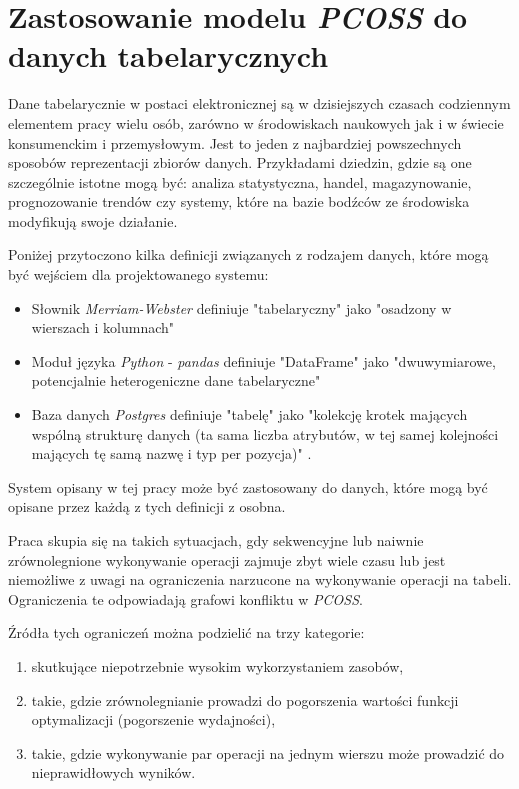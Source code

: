 \documentclass[brudnopis]{xmgr}
\begin{document}
\chapter{Zastosowanie modelu \emph{PCOSS} do danych tabelarycznych}

Dane tabelarycznie w postaci elektronicznej są w dzisiejszych czasach codziennym elementem pracy wielu osób, zarówno w środowiskach naukowych jak i w świecie konsumenckim i przemysłowym. Jest to jeden z najbardziej powszechnych sposobów reprezentacji zbiorów danych. Przykładami dziedzin, gdzie są one szczególnie istotne mogą być: analiza statystyczna, handel, magazynowanie, prognozowanie trendów czy systemy, które na bazie bodźców ze środowiska modyfikują swoje działanie.
\medskip

Poniżej przytoczono kilka definicji związanych z rodzajem danych, które mogą być wejściem dla projektowanego systemu:

\begin{itemize}
    \item Słownik \emph{Merriam-Webster} definiuje "tabelaryczny" jako "osadzony w wierszach i kolumnach" \cite{MW:TAB}
    \item Moduł języka \emph{Python} - \emph{pandas} definiuje "DataFrame" jako "dwuwymiarowe, potencjalnie heterogeniczne dane tabelaryczne" \cite{P:DF}
    \item Baza danych \emph{Postgres} definiuje "tabelę" jako "kolekcję krotek mających wspólną strukturę danych (ta sama liczba atrybutów, w tej samej kolejności mających tę samą nazwę i typ per pozycja)" \cite{PSQL:TAB}.
\end{itemize}
\medskip

System opisany w tej pracy może być zastosowany do danych, które mogą być opisane przez każdą z tych definicji z osobna.

Praca skupia się na takich sytuacjach, gdy sekwencyjne lub naiwnie zrównolegnione wykonywanie operacji zajmuje zbyt wiele czasu lub jest niemożliwe z uwagi na ograniczenia narzucone na wykonywanie operacji na tabeli.
Ograniczenia te odpowiadają grafowi konfliktu w \emph{PCOSS}.
\medskip

Źródła tych ograniczeń można podzielić na trzy kategorie:
\begin{enumerate}
    \item skutkujące niepotrzebnie wysokim wykorzystaniem zasobów,
    \item takie, gdzie zrównolegnianie prowadzi do pogorszenia wartości funkcji optymalizacji (pogorszenie wydajności),
    \item takie, gdzie wykonywanie par operacji na jednym wierszu może prowadzić do nieprawidłowych wyników.
\end{enumerate}
\medskip
\end{document}

